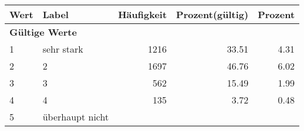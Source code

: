      \begin{longtable}{lXrrr}
     \toprule
     \textbf{Wert} & \textbf{Label} & \textbf{Häufigkeit} & \textbf{Prozent(gültig)} & \textbf{Prozent} \\
     \endhead
     \midrule
     \multicolumn{5}{l}{\textbf{Gültige Werte}}\\

     1 &
     \multicolumn{1}{X}{ sehr stark   } &


       \num{1216} &
       \num[round-mode=places,round-precision=2]{33.51} &
         \num[round-mode=places,round-precision=2]{4.31} \\

     2 &
     \multicolumn{1}{X}{ 2   } &


       \num{1697} &
       \num[round-mode=places,round-precision=2]{46.76} &
         \num[round-mode=places,round-precision=2]{6.02} \\

     3 &
     \multicolumn{1}{X}{ 3   } &


       \num{562} &
       \num[round-mode=places,round-precision=2]{15.49} &
         \num[round-mode=places,round-precision=2]{1.99} \\

     4 &
     \multicolumn{1}{X}{ 4   } &


       \num{135} &
       \num[round-mode=places,round-precision=2]{3.72} &
         \num[round-mode=places,round-precision=2]{0.48} \\

     5 &
     \multicolumn{1}{X}{ überhaupt nicht   } &



\end{longtable}
